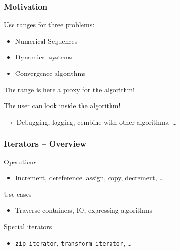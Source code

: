 \documentclass{beamer}
\newcommand{\heading}[1]{\frametitle{#1}}
\begin{document}
\begin{frame}[fragile]
 \heading{Motivation}
 
 Use ranges for three problems:
 
 \begin{itemize}
  \item Numerical Sequences
  \item Dynamical systems
  \item Convergence algorithms
 \end{itemize}
 
 \vspace{2ex}
 
 The range is here a proxy for the algorithm!
 
 \vspace{2ex}
 The user can look inside the algorithm!
 
 $\longrightarrow$ Debugging, logging, combine with other algorithms, \dots

\end{frame}




\begin{frame}[fragile]
 \heading{Iterators -- Overview}
 
 Operations
 \begin{itemize}
   \item Increment, dereference, assign, copy, decrement, \dots
 \end{itemize}
 
 \vspace{2ex}
 Use cases
 \begin{itemize}
   \item Traverse containers, IO, expressing algorithms
 \end{itemize}

 \vspace{2ex}
 Special iterators
 \begin{itemize}
  \item \lstinline$zip_iterator$, \lstinline$transform_iterator$, \dots
 \end{itemize}


\end{frame}
\end{document}
